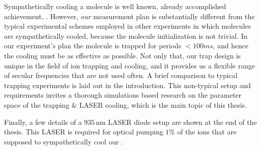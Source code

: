 {Sympathetically cooling a molecule is well known, already accomplished achievement, %
. However, \emph{our} measurement plan is substantially different from the typical
experimental schemes employed in other experiments in which molecules
are sympathetically cooled, because the molecule initialization is not
trivial. In our experiment's plan the molecule is trapped for periods
\(<100ms\), and hence the cooling must be as effective as possible. Not
only that, our trap design is unique in the field of ion trapping and
cooling, and it provides us a flexible range of secular frequencies that
are not used often. A brief comparison to typical trapping experiments
is laid out in the introduction. This non-typical setup and requirements
invites a thorough simulations based research on the parameter space of
the trapping \& LASER cooling, which is the main topic of this thesis.

Finally, a few details of a \(935\,\mathrm{nm}\) LASER diode setup are
shown at the end of the thesis. This LASER is required for optical
pumping $1\%$ of the  ions that are supposed to sympathetically cool
our .

} %


